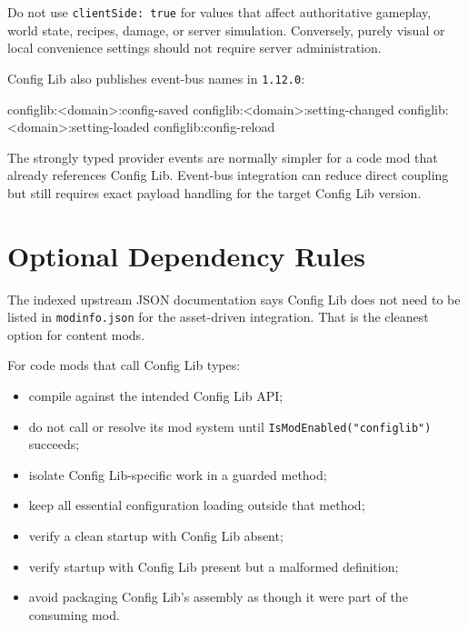 \documentclass[
  11pt,
  letterpaper,
  titlepage]{article}
\newenvironment{Shaded}{\begin{snugshade}}{\end{snugshade}}
\newcommand{\NormalTok}[1]{#1}
\providecommand{\tightlist}{%
  \setlength{\itemsep}{0pt}\setlength{\parskip}{0pt}}
\begin{document}
Do not use \texttt{clientSide:\ true} for values that affect
authoritative gameplay, world state, recipes, damage, or server
simulation. Conversely, purely visual or local convenience settings
should not require server administration.

Config Lib also publishes event-bus names in \texttt{1.12.0}:

\begin{Shaded}
\begin{Highlighting}[]
\NormalTok{configlib:\textless{}domain\textgreater{}:config{-}saved}
\NormalTok{configlib:\textless{}domain\textgreater{}:setting{-}changed}
\NormalTok{configlib:\textless{}domain\textgreater{}:setting{-}loaded}
\NormalTok{configlib:config{-}reload}
\end{Highlighting}
\end{Shaded}

The strongly typed provider events are normally simpler for a code mod
that already references Config Lib. Event-bus integration can reduce
direct coupling but still requires exact payload handling for the target
Config Lib version.

\section{Optional Dependency Rules}\label{optional-dependency-rules}

The indexed upstream JSON documentation says Config Lib does not need to
be listed in \texttt{modinfo.json} for the asset-driven integration.
That is the cleanest option for content mods.

For code mods that call Config Lib types:

\begin{itemize}
\tightlist
\item
  compile against the intended Config Lib API;
\item
  do not call or resolve its mod system until
  \texttt{IsModEnabled("configlib")} succeeds;
\item
  isolate Config Lib-specific work in a guarded method;
\item
  keep all essential configuration loading outside that method;
\item
  verify a clean startup with Config Lib absent;
\item
  verify startup with Config Lib present but a malformed definition;
\item
  avoid packaging Config Lib's assembly as though it were part of the
  consuming mod.
\end{itemize}
\end{document}
